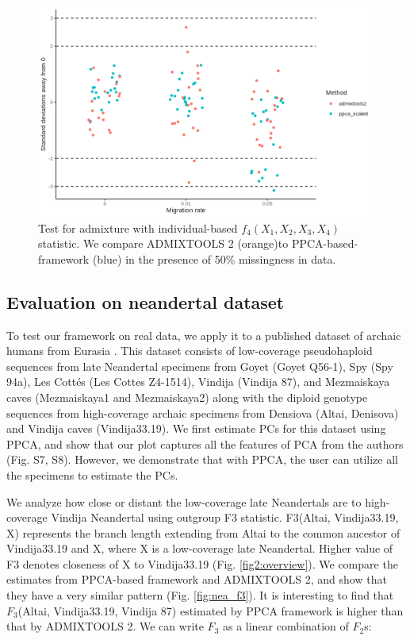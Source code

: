 \documentclass[12pt, letterpaper]{article}
\begin{document}
\begin{figure}[ht!]
    \includegraphics[width=16.5cm]{plots/simfiles/AvgFolder/Ne1000/split_times1000/npop10_nind100/missing0.5/plots_8/hypothesis_test_comparison.png}
    \centering
         \caption{Test for admixture with individual-based $f_4(X_1, X_2, X_3, X_4)$ statistic. We compare ADMIXTOOLS 2 (orange)to PPCA-based-framework (blue) in the presence of 50\% missingness in data.}
    \label{fig:admixture}
\end{figure}

\subsection{Evaluation on neandertal dataset}

To test our framework on real data, we apply it to a published dataset of archaic humans from Eurasia \cite{hajdinjak_reconstructing_2018}. This dataset consists of low-coverage pseudohaploid sequences from late Neandertal specimens from Goyet (Goyet Q56-1), Spy (Spy 94a), Les Cottés (Les Cottes Z4-1514), Vindija (Vindija 87), and Mezmaiskaya caves (Mezmaiskaya1 and Mezmaiskaya2) along with the diploid genotype sequences from high-coverage archaic specimens from Densiova (Altai, Denisova) and Vindija caves (Vindija33.19). We first estimate PCs for this dataset using PPCA, and show that our plot captures all the features of PCA from the authors (Fig. S7, S8). However, we demonstrate that with PPCA, the user can utilize all the specimens to estimate the PCs. 

We analyze how close or distant the low-coverage late Neandertals are to high-coverage Vindija Neandertal using outgroup F3 statistic. F3(Altai, Vindija33.19, X) represents the branch length extending from Altai to the common ancestor of Vindija33.19 and X, where X is a low-coverage late Neandertal. Higher value of F3 denotes closeness of X to Vindija33.19 (Fig. \ref{fig2:overview}). We compare the estimates from PPCA-based framework and ADMIXTOOLS 2, and show that they have a very similar pattern (Fig. \ref{fig:nea_f3}). It is interesting to find that $F_3$(Altai, Vindija33.19, Vindija 87) estimated by PPCA framework is higher than that by ADMIXTOOLS 2. We can write $F_3$ as a linear combination of $F_2$s:
\end{document}
